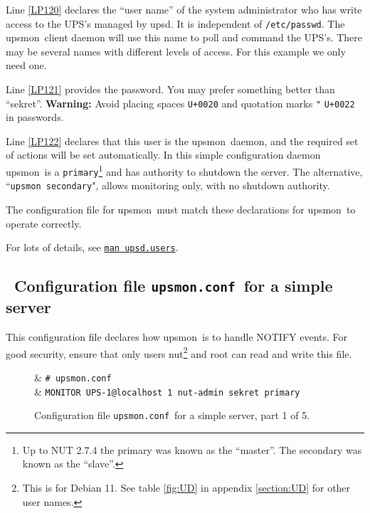 \documentclass[12pt]{article}
\newlength{\headersep}\setlength{\headersep}{3mm}
\newcommand{\Hsep}{\hspace{\headersep}}
\newcommand{\upsd}{\mbox{\textcolor{UPSDCOLOUR}{upsd}}}
\newcommand{\upsmon}{\mbox{\textcolor{MONCOLOUR}{upsmon}}}
\newcommand{\upsmonconf}{\textcolor{MONCOLOUR}{\texttt{upsmon.conf}}}
\newcommand{\NUTman}[1]{\href{https://networkupstools.org/docs/man/#1.html}{\texttt{man #1}}}
\begin{document}
Line \ref{LP120} declares the ``user name'' of the system administrator who
has write access to the UPS's managed by \upsd.  It is independent of
\texttt{/etc/passwd}.  The \upsmon\ client daemon will use this name to poll
and command the UPS's.  There may be several names with different levels of
access.  For this example we only need one.

Line \ref{LP121} provides the password.  You may prefer something
better than ``sekret''.  \textbf{Warning:} Avoid placing spaces
\texttt{U+0020} and quotation marks \texttt{"} \texttt{U+0022} in
passwords.

Line \ref{LP122} declares that this user is the \upsmon\ daemon, and
the required set of actions will be set automatically.  In this simple
configuration daemon \upsmon\ is a \texttt{primary}\footnote{Up to NUT
2.7.4 the primary was known as the ``master''.  The secondary was
known as the ``slave''.} and has authority to shutdown the server.
The alternative, ``\texttt{upsmon secondary}", allows monitoring only,
with no shutdown authority.

The configuration file for \upsmon\ must match these declarations for
\upsmon\ to operate correctly.

For lots of details, see \NUTman{upsd.users}.

\subsection{\Hsep\ Configuration file \upsmonconf\ for a simple server}\label{section:upsmonconf}

This configuration file declares how \upsmon\ is to handle NOTIFY
events.  For good security, ensure that only users nut\footnote{This
is for Debian 11.  See table \ref{fig:UD} in appendix \ref{section:UD}
for other user names.} and root can read and write this file.

\begin{figure}[ht]
\begin{LinePrinter}[0.75\LinePrinterwidth]
\Clunk[LP200]  & \verb`# upsmon.conf` \\
\Clunk[LP201]  & \verb`MONITOR UPS-1@localhost 1 nut-admin sekret primary` \\
\end{LinePrinter}
\vspace{-6mm}
\caption{Configuration file \upsmonconf\ for a simple server, part 1 of 5.\label{fig:upsmonconf1}}
\end{figure}
\end{document}

